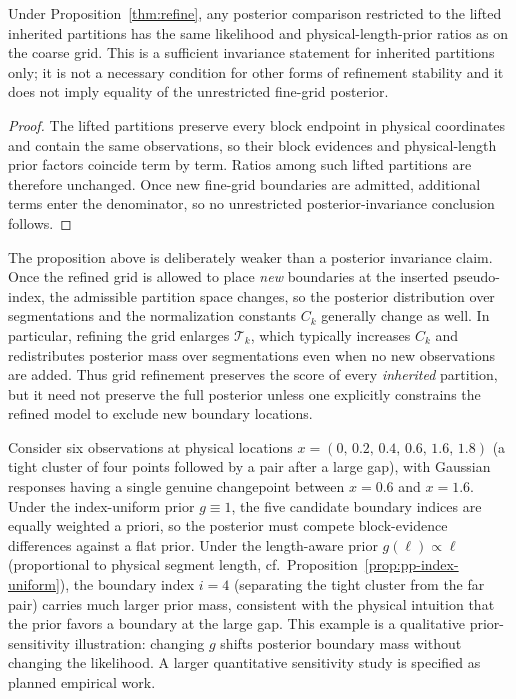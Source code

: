 \begin{corollary}
\label{cor:inherited-partition-invariance}
Under Proposition~\ref{thm:refine}, any posterior comparison restricted to the lifted inherited
partitions has the same likelihood and physical-length-prior ratios as on the coarse grid. This is a
sufficient invariance statement for inherited partitions only; it is not a necessary condition for
other forms of refinement stability and it does not imply equality of the unrestricted fine-grid
posterior.
\end{corollary}

\begin{proof}
The lifted partitions preserve every block endpoint in physical coordinates and contain the same
observations, so their block evidences and physical-length prior factors coincide term by term. Ratios
among such lifted partitions are therefore unchanged. Once new fine-grid boundaries are admitted,
additional terms enter the denominator, so no unrestricted posterior-invariance conclusion follows.
\end{proof}

\begin{remark}
The proposition above is deliberately weaker than a posterior invariance claim. Once the refined grid is
allowed to place \emph{new} boundaries at the inserted pseudo-index, the admissible partition space changes,
so the posterior distribution over segmentations and the normalization constants $C_k$ generally change as
well. In particular, refining the grid enlarges $\mathcal{T}_k$, which typically increases $C_k$ and
redistributes posterior mass over segmentations even when no new observations are added. Thus grid
refinement preserves the score of every \emph{inherited} partition, but it need not preserve the full
posterior unless one explicitly constrains the refined model to exclude new boundary locations.
\end{remark}

\begin{example}
\label{ex:irregular-illustration}
Consider six observations at physical locations $x=(0,\,0.2,\,0.4,\,0.6,\,1.6,\,1.8)$ (a tight
cluster of four points followed by a pair after a large gap), with Gaussian responses having a
single genuine changepoint between $x=0.6$ and $x=1.6$. Under the index-uniform prior
$g\equiv 1$, the five candidate boundary indices are equally weighted a priori, so the posterior
must compete block-evidence differences against a flat prior. Under the length-aware prior
$g(\ell)\propto \ell$ (proportional to physical segment length, cf.\
Proposition~\ref{prop:pp-index-uniform}), the boundary index $i=4$ (separating the tight cluster
from the far pair) carries much larger prior mass, consistent with the physical intuition that
the prior favors a boundary at the large gap. This example is a qualitative prior-sensitivity illustration: changing $g$ shifts posterior
boundary mass without changing the likelihood. A larger quantitative sensitivity study is specified
as planned empirical work.
\end{example}

